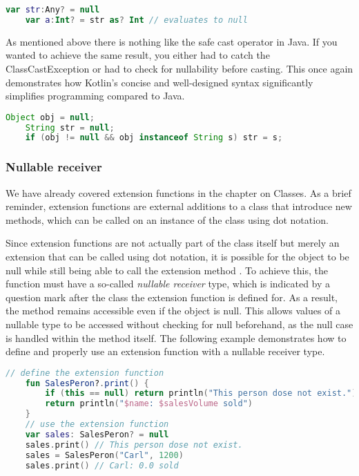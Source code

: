 \documentclass[a4paper, 11pt]{article}
\begin{document}
  \begin{lstlisting}[language=Kotlin,title={Usage of the safe cast operator on a nullable value}]
    var str:Any? = null
    var a:Int? = str as? Int // evaluates to null
  \end{lstlisting}
  As mentioned above there is nothing like the safe cast operator in Java. If you wanted to achieve the same result, you either had to catch the ClassCastException or  had to check for nullability before casting. This once again demonstrates how Kotlin's concise and well-designed syntax significantly simplifies programming compared to Java.
  \begin{lstlisting}[language=Java,title={Functionality of safe call operator in java}]
    Object obj = null;
    String str = null;
    if (obj != null && obj instanceof String s) str = s;
  \end{lstlisting}

\subsubsection{Nullable receiver}
  We have already covered extension functions in the chapter on Classes. As a brief reminder, extension functions are external additions to a class that introduce new methods, which can be called on an instance of the class using dot notation.

  Since extension functions are not actually part of the class itself but merely an extension that can be called using dot notation, it is possible for the object to be null while still being able to call the extension method \cite{nullsafety-nullable-receiver}. To achieve this, the function must have a so-called \textit{nullable receiver} type, which is indicated by a question mark after the class the extension function is defined for. As a result, the method remains accessible even if the object is null. This allows values of a nullable type to be accessed without checking for null beforehand, as the null case is handled within the method itself. The following example demonstrates how to define and properly use an extension function with a nullable receiver type.
  \begin{lstlisting}[language=Kotlin,title={Usage of an extension function}]
    // define the extension function
    fun SalesPeron?.print() {
        if (this == null) return println("This person dose not exist.")
        return println("$name: $salesVolume sold")
    }
    // use the extension function
    var sales: SalesPeron? = null
    sales.print() // This person dose not exist.
    sales = SalesPeron("Carl", 1200)
    sales.print() // Carl: 0.0 sold
  \end{lstlisting}
\end{document}
